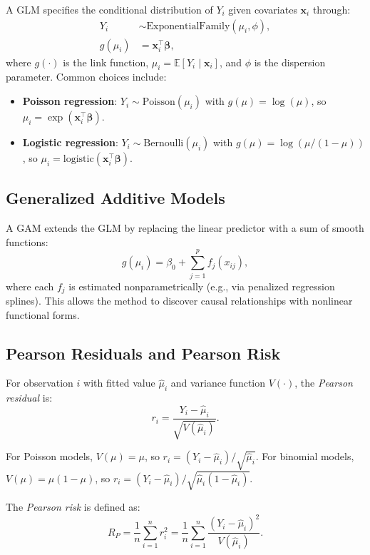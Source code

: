 \documentclass[11pt,a4paper]{article}
\newcommand{\E}{\mathbb{E}}
\begin{document}
A GLM specifies the conditional distribution of $Y_i$ given covariates $\mathbf{x}_i$ through:
\begin{align}
Y_i &\sim \text{ExponentialFamily}(\mu_i, \phi), \\
g(\mu_i) &= \mathbf{x}_i^\top \boldsymbol{\beta},
\end{align}
where $g(\cdot)$ is the link function, $\mu_i = \E[Y_i \mid \mathbf{x}_i]$, and $\phi$ is the dispersion parameter. Common choices include:
\begin{itemize}
    \item \textbf{Poisson regression}: $Y_i \sim \text{Poisson}(\mu_i)$ with $g(\mu) = \log(\mu)$, so $\mu_i = \exp(\mathbf{x}_i^\top \boldsymbol{\beta})$.
    \item \textbf{Logistic regression}: $Y_i \sim \text{Bernoulli}(\mu_i)$ with $g(\mu) = \log(\mu/(1-\mu))$, so $\mu_i = \text{logistic}(\mathbf{x}_i^\top \boldsymbol{\beta})$.
\end{itemize}

\subsection{Generalized Additive Models}

A GAM extends the GLM by replacing the linear predictor with a sum of smooth functions:
\begin{equation}
g(\mu_i) = \beta_0 + \sum_{j=1}^{p} f_j(x_{ij}),
\end{equation}
where each $f_j$ is estimated nonparametrically (e.g., via penalized regression splines). This allows the method to discover causal relationships with nonlinear functional forms.

\subsection{Pearson Residuals and Pearson Risk}

For observation $i$ with fitted value $\hat{\mu}_i$ and variance function $V(\cdot)$, the \emph{Pearson residual} is:
\begin{equation}
r_i = \frac{Y_i - \hat{\mu}_i}{\sqrt{V(\hat{\mu}_i)}}.
\end{equation}

For Poisson models, $V(\mu) = \mu$, so $r_i = (Y_i - \hat{\mu}_i)/\sqrt{\hat{\mu}_i}$. For binomial models, $V(\mu) = \mu(1-\mu)$, so $r_i = (Y_i - \hat{\mu}_i)/\sqrt{\hat{\mu}_i(1-\hat{\mu}_i)}$.

The \emph{Pearson risk} is defined as:
\begin{equation}
\label{eq:pearson_risk}
R_P = \frac{1}{n} \sum_{i=1}^{n} r_i^2 = \frac{1}{n} \sum_{i=1}^{n} \frac{(Y_i - \hat{\mu}_i)^2}{V(\hat{\mu}_i)}.
\end{equation}
\end{document}
